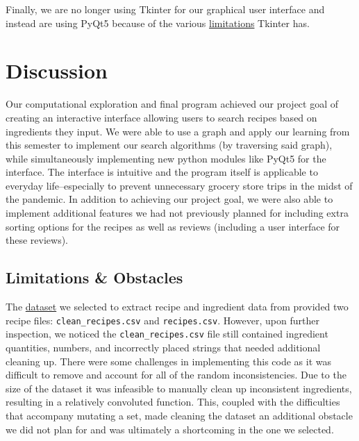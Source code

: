 \documentclass[fontsize=11pt]{article}
\begin{document}
    Finally, we are no longer using Tkinter for our graphical user interface and instead are using PyQt5 because of the various \hyperref[sec:pyqt5]{limitations} Tkinter has.


    \section*{Discussion}

    Our computational exploration and final program achieved our project goal of creating an interactive interface allowing users to search recipes based on ingredients they input. We were able to use a graph and apply our learning from this semester to implement our search algorithms (by traversing said graph), while simultaneously implementing new python modules like PyQt5 for the interface. The interface is intuitive and the program itself is applicable to everyday life–especially to prevent unnecessary grocery store trips in the midst of the pandemic. In addition to achieving our project goal, we were also able to implement additional features we had not previously planned for including extra sorting options for the recipes as well as reviews (including a user interface for these reviews).

    \subsection*{Limitations \& Obstacles}

    The \hyperref[sec:dataset]{dataset} we selected to extract recipe and ingredient data from provided two recipe files: \texttt{clean\_recipes.csv} and \texttt{recipes.csv}. However, upon further inspection, we noticed the \texttt{clean\_recipes.csv} file still contained ingredient quantities, numbers, and incorrectly placed strings that needed additional cleaning up. There were some challenges in implementing this code as it was difficult to remove and account for all of the random inconsistencies. Due to the size of the dataset it was infeasible to manually clean up inconsistent ingredients, resulting in a relatively convoluted function. This, coupled with the difficulties that accompany mutating a set, made cleaning the dataset an additional obstacle we did not plan for and was ultimately a shortcoming in the one we selected. \\
\end{document}
